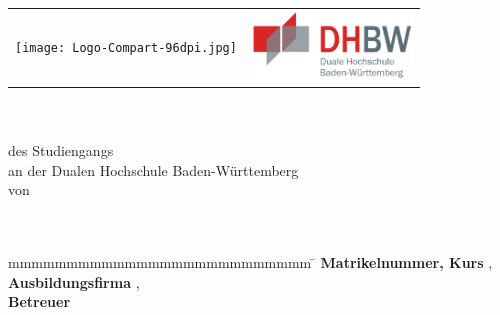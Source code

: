 
\begin{titlepage}
	\begin{longtable}{p{} p{}}
	  {\texttt{[image: Logo-Compart-96dpi.jpg]}} & 
	  {\includegraphics[height=1.8cm]{images/dhbw.png}}
	\end{longtable}
	\enlargethispage{20mm}
	\begin{center}
	  \vspace*{12mm}	{\LARGE\bf \titel }\\
	  \vspace*{12mm}	{\large\bf \arbeit}\\
	  \vspace*{12mm}	des Studiengangs \studiengang\\
	  \vspace*{3mm} 	an der Dualen Hochschule Baden-Württemberg \dhbw\\
	  \vspace*{12mm}	von\\
	  \vspace*{3mm} 	{\large\bf \autor}\\
	  \vspace*{12mm}	\datumAbgabe\\
	\end{center}
	\vfill
	\begin{spacing}{1.2}
	\begin{tabbing}
		mmmmmmmmmmmmmmmmmmmmmmmmmm     \= \kill
		\textbf{Matrikelnummer, Kurs}  \>  \martrikelnr, \kurs\\
		\textbf{Ausbildungsfirma}      \>  \firma, \firmenort\\
		\textbf{Betreuer}              \>  \betreuer\\
	\end{tabbing}
	\end{spacing}
\end{titlepage}
